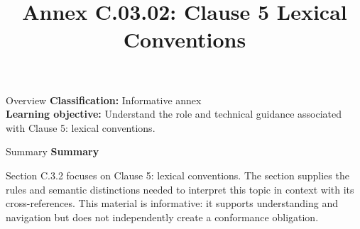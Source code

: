 \documentclass[10pt,letterpaper]{article}
\title{Annex C.03.02: Clause 5 Lexical Conventions}
\author{}
\date{}
\begin{document}
\maketitle
\begin{CornellOverviewBox}{Overview}
\textbf{Classification:} Informative annex\\[2pt]
\textbf{Learning objective:} Understand the role and technical guidance associated with Clause 5: lexical conventions.
\end{CornellOverviewBox}\begin{CornellSummaryBox}{Summary}
{\sffamily\bfseries\color{Accent} Summary}\par\vspace{3pt}Section C.3.2 focuses on Clause 5: lexical conventions. The section supplies the rules and semantic distinctions needed to interpret this topic in context with its cross-references. This material is informative: it supports understanding and navigation but does not independently create a conformance obligation.
\end{CornellSummaryBox}
\end{document}
